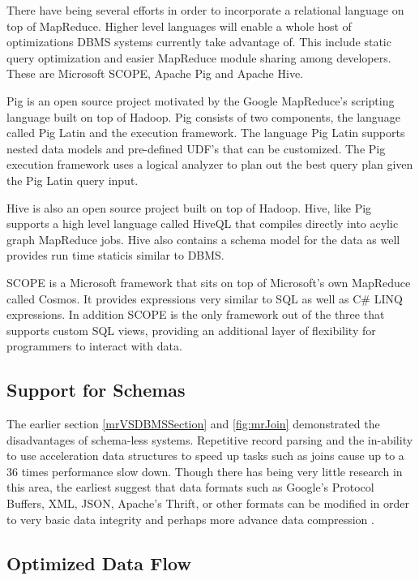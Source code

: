 \documentclass[10pt,twocolumn]{IEEEtran11}
\begin{document}
There have being several efforts in order to incorporate a relational language on top of MapReduce.  Higher level languages will enable a whole host of optimizations DBMS systems currently take advantage of.  This include static query optimization and easier MapReduce module sharing among developers.  These are Microsoft SCOPE\cite{chaiken2008scope}, Apache Pig \cite{olston2008pig} and Apache Hive\cite{thusoo2009hive}.
\par
Pig is an open source project motivated by the Google MapReduce's scripting language built on top of Hadoop.  Pig consists of two components, the language called Pig Latin and the execution framework.  The language Pig Latin supports nested data models and pre-defined UDF's that can be customized.  The Pig execution framework uses a logical analyzer to plan out the best query plan given the Pig Latin query input.
\par
Hive is also an open source project built on top of Hadoop.  Hive, like Pig supports a high level language called HiveQL that compiles directly into acylic graph MapReduce jobs.  Hive also contains a schema model for the data as well provides run time staticis similar to DBMS.
\par
SCOPE is a Microsoft framework that sits on top of Microsoft's own MapReduce called Cosmos.  It provides expressions very similar to SQL as well as C\# LINQ expressions.  In addition SCOPE is the only framework out of the three that supports custom SQL views, providing an additional layer of flexibility for programmers to interact with data.

\subsection{Support for Schemas}

The earlier section \ref{mrVSDBMSSection} and \ref{fig:mrJoin} demonstrated the disadvantages of schema-less systems.   Repetitive record parsing and the in-ability to use acceleration data structures to speed up tasks such as joins cause up to a 36 times performance slow down.  Though there has being very little research in this area, the earliest suggest that data formats such as Google's Protocol Buffers,
XML, JSON, Apache's Thrift, or other formats can be modified in order to very basic data integrity and perhaps more advance data compression \cite{yang2007map}.

\subsection{Optimized Data Flow}
\end{document}
